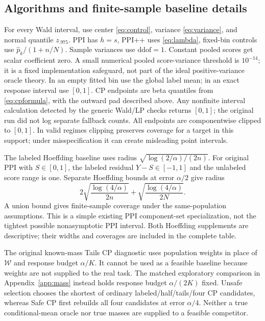 \documentclass{article}
\begin{document}
\subsection{Algorithms and finite-sample baseline details}
For every Wald interval, use center \eqref{eq:control}, variance \eqref{eq:variance}, and normal quantile $z_{.975}$. PPI has $h=s$, PPI++ uses \eqref{eq:lambda}, fixed-bin controls use $\widehat p_k/(1+n/N)$. Sample variances use $\mathrm{ddof}=1$. Constant pooled scores get scalar coefficient zero. A small numerical pooled score-variance threshold is $10^{-14}$; it is a fixed implementation safeguard, not part of the ideal positive-variance oracle theory. In an empty fitted bin use the global label mean; in an exact response interval use $[0,1]$. CP endpoints are beta quantiles from \eqref{eq:cpformula}, with the outward pad described above. Any nonfinite interval calculation detected by the generic Wald/LP checks returns $[0,1]$; the original run did not log separate fallback counts. All endpoints are componentwise clipped to $[0,1]$. In valid regimes clipping preserves coverage for a target in this support; under misspecification it can create misleading point intervals.

The labeled Hoeffding baseline uses radius $\sqrt{\log(2/\alpha)/(2n)}$. For original PPI with $S\in[0,1]$, the labeled residual $Y-S\in[-1,1]$ and the unlabeled score range is one. Separate Hoeffding bounds at error $\alpha/2$ give radius
\begin{equation}\label{eq:hoeffding}
 2\sqrt{\frac{\log(4/\alpha)}{2n}}+\sqrt{\frac{\log(4/\alpha)}{2N}}.
\end{equation}
A union bound gives finite-sample coverage under the same-population assumptions. This is a simple existing PPI component-set specialization, not the tightest possible nonasymptotic PPI interval. Both Hoeffding supplements are descriptive; their widths and coverages are included in the complete table.

The original known-mass Tails CP diagnostic uses population weights in place of $\mathcal W$ and response budget $\alpha/K$. It cannot be used as a feasible baseline because weights are not supplied to the real task. The matched exploratory comparison in Appendix~\ref{app:mass} instead holds response budget $\alpha/(2K)$ fixed. Unsafe selection chooses the shortest of ordinary labeled/half/tails/four CP candidates, whereas Safe CP first rebuilds all four candidates at error $\alpha/4$. Neither a true conditional-mean oracle nor true masses are supplied to a feasible competitor.
\end{document}
